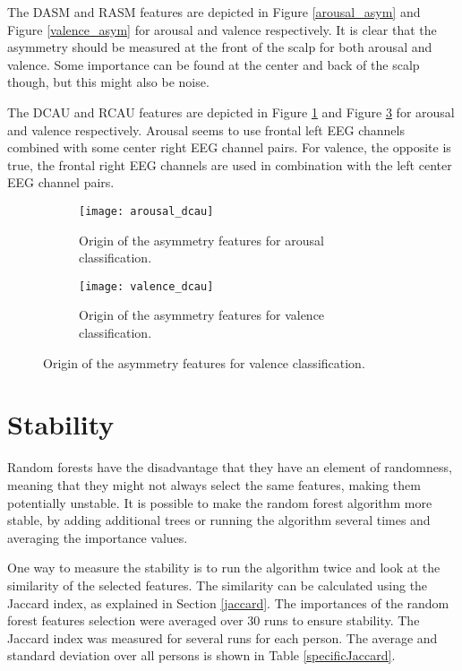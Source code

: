 The DASM and RASM features are depicted in Figure \ref{arousal_asym} and Figure \ref{valence_asym} for arousal and valence respectively. It is clear that the asymmetry should be measured at the front of the scalp for both arousal and valence. Some importance can be found at the center and back of the scalp though, but this might also be noise.

\npar

The DCAU and RCAU features are depicted in Figure \ref{arousal_dcau} and Figure \ref{valence_dcau} for arousal and valence respectively. Arousal seems to use frontal left EEG channels combined with some center right EEG channel pairs. For valence, the opposite is true, the frontal right EEG channels are used in combination with the left center EEG channel pairs.

\begin{figure}[H]
\centering
  \begin{subfigure}[b]{.4\textwidth}
    \texttt{[image: arousal\_dcau]}
    \caption{Origin of the asymmetry features for arousal classification.\label{arousal_dcau}}
  \end{subfigure}
\hfill
  \begin{subfigure}[b]{.4\textwidth}
    \texttt{[image: valence\_dcau]}
    \caption{Origin of the asymmetry features for valence classification.\label{valence_dcau}}
  \end{subfigure}
\end{figure}

\section{Stability}
Random forests have the disadvantage that they have an element of randomness, meaning that they might not always select the same features, making them potentially unstable. It is possible to make the random forest algorithm more stable, by adding additional trees or running the algorithm several times and averaging the importance values. 

\npar

One way to measure the stability is to run the algorithm twice and look at the similarity of the selected features. The similarity can be calculated using the Jaccard index, as explained in Section \ref{jaccard}. The importances of the random forest features selection were averaged over 30 runs to ensure stability. The Jaccard index was measured for several runs for each person. The average and standard deviation over all persons is shown in Table \ref{specificJaccard}.

